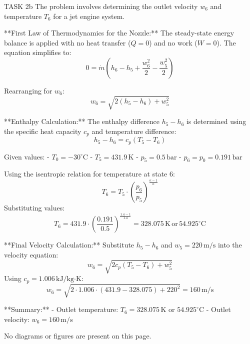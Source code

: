 TASK 2b  
The problem involves determining the outlet velocity \( w_6 \) and temperature \( T_6 \) for a jet engine system.  

**First Law of Thermodynamics for the Nozzle:**  
The steady-state energy balance is applied with no heat transfer (\( Q = 0 \)) and no work (\( W = 0 \)). The equation simplifies to:  
\[
0 = \dot{m} \left( h_6 - h_5 + \frac{w_6^2}{2} - \frac{w_5^2}{2} \right)
\]  

Rearranging for \( w_6 \):  
\[
w_6 = \sqrt{2 \left( h_5 - h_6 \right) + w_5^2}
\]  

**Enthalpy Calculation:**  
The enthalpy difference \( h_5 - h_6 \) is determined using the specific heat capacity \( c_p \) and temperature difference:  
\[
h_5 - h_6 = c_p \left( T_5 - T_6 \right)
\]  

Given values:  
- \( T_0 = -30^\circ\text{C} \)  
- \( T_5 = 431.9 \, \text{K} \)  
- \( p_5 = 0.5 \, \text{bar} \)  
- \( p_6 = p_0 = 0.191 \, \text{bar} \)  

Using the isentropic relation for temperature at state 6:  
\[
T_6 = T_5 \cdot \left( \frac{p_6}{p_5} \right)^{\frac{\kappa - 1}{\kappa}}
\]  
Substituting values:  
\[
T_6 = 431.9 \cdot \left( \frac{0.191}{0.5} \right)^{\frac{1.4 - 1}{1.4}} = 328.075 \, \text{K} \, \text{or} \, 54.925^\circ\text{C}
\]  

**Final Velocity Calculation:**  
Substitute \( h_5 - h_6 \) and \( w_5 = 220 \, \text{m/s} \) into the velocity equation:  
\[
w_6 = \sqrt{2 c_p \left( T_5 - T_6 \right) + w_5^2}
\]  
Using \( c_p = 1.006 \, \text{kJ/kg·K} \):  
\[
w_6 = \sqrt{2 \cdot 1.006 \cdot (431.9 - 328.075) + 220^2} = 160 \, \text{m/s}
\]  

**Summary:**  
- Outlet temperature: \( T_6 = 328.075 \, \text{K} \) or \( 54.925^\circ\text{C} \)  
- Outlet velocity: \( w_6 = 160 \, \text{m/s} \)  

No diagrams or figures are present on this page.
